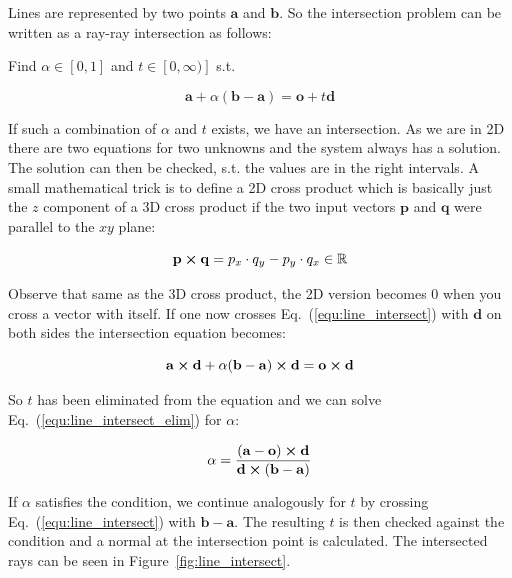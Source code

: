 \documentclass[a4paper,10pt]{article}
\renewcommand{\vec}[1]{\mathbf{#1}}
\newcommand{\equref}[1]{Eq.~(\ref{#1})}
\newcommand{\figref}[1]{Figure~\ref{#1}}
\begin{document}
    Lines are represented by two points $\vec{a}$ and $\vec{b}$.
    So the intersection problem can be written as a ray-ray intersection
    as follows:

    Find $\alpha \in [0,1]$ and $t \in [0, \infty)]$ s.t. 

    \begin{equation}
        \label{equ:line_intersect}
        \vec{a} + \alpha (\vec{b} - \vec{a}) = \vec{o} + t \vec{d}
    \end{equation}

    If such a combination of $\alpha$ and $t$ exists, we have an intersection.
    As we are in 2D there are two equations for two unknowns and the
    system always has a solution.
    The solution can then be checked, s.t. the values are in the right
    intervals.
    A small mathematical trick is to define a 2D cross product which
    is basically just the $z$ component of a 3D cross product if the
    two input vectors $\vec{p}$ and $\vec{q}$ were parallel to the
    $xy$ plane:
    
    \begin{equation}
        \label{equ:2d_cross}
        \vec{p} \cross \vec{q} = 
        p_x \cdot q_y - p_y \cdot q_x \in \mathbb{R}
    \end{equation}

    Observe that same as the 3D cross product, the 2D version becomes 0
    when you cross a vector with itself.
    If one now crosses \equref{equ:line_intersect} with $\vec{d}$ on
    both sides the intersection equation becomes:
    
    \begin{equation}
        \label{equ:line_intersect_elim}
        \vec{a} \cross \vec{d} + \alpha (\vec{b} - \vec{a}) \cross \vec{d} =
        \vec{o} \cross \vec{d}
    \end{equation}

    So $t$ has been eliminated from the equation and we can solve 
    \equref{equ:line_intersect_elim} for $\alpha$:

    \begin{equation}
        \label{equ:line_intersect_alpha}
        \alpha = \frac{(\vec{a} - \vec{o}) \cross \vec{d}}
                      {\vec{d} \cross (\vec{b} - \vec{a})}
    \end{equation}

    If $\alpha$ satisfies the condition, we continue analogously for
    $t$ by crossing \equref{equ:line_intersect} with $\vec{b} - \vec{a}$.
    The resulting $t$ is then checked against the condition and
    a normal at the intersection point is calculated.
    The intersected rays can be seen in \figref{fig:line_intersect}.
\end{document}
